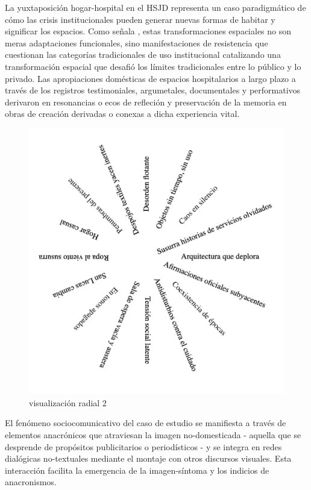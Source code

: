\documentclass[12pt]{article}
\begin{document}
La yuxtaposición hogar-hospital en el HSJD representa un caso paradigmático de cómo las crisis institucionales pueden generar nuevas formas de habitar y significar los espacios. Como señala \cite{Castiblanco2017}, estas transformaciones espaciales no son meras adaptaciones funcionales, sino manifestaciones de resistencia que cuestionan las categorías tradicionales de uso institucional catalizando una transformación espacial que desafió los límites tradicionales entre lo público y lo privado. Las apropiaciones domésticas de espacios hospitalarios a largo plazo a través de los registros testimoniales, argumetales, documentales y performativos derivaron en resonancias o ecos de refleción y preservación de la memoria en obras de creación derivadas o conexas a dicha experiencia vital.

\begin{figure}[h]
    \centering
    \includegraphics[width=\textwidth]{images/category2.png}
    \caption{visualización radial 2}
    \label{fig:category2}
\end{figure}


El fenómeno sociocomunicativo del caso de estudio se manifiesta a través de elementos anacrónicos que atraviesan la imagen no-domesticada - aquella que se desprende de propósitos publicitarios o periodísticos - y se integra en redes dialógicas no-textuales mediante el montaje con otros discursos visuales. Esta interacción facilita la emergencia de la imagen-síntoma y los indicios de anacronismos.




\printbibliography
\end{document}
